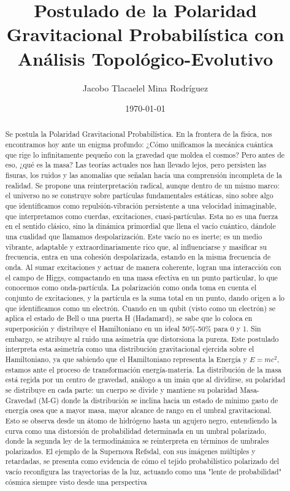 \documentclass[11pt, a4paper]{article}
\title{Postulado de la Polaridad Gravitacional Probabilística con Análisis Topológico-Evolutivo}
\author{Jacobo Tlacaelel Mina Rodríguez}
\date{\today}
\begin{document}

\maketitle

\begin{abstract}
Se postula la Polaridad Gravitacional Probabilística. En la frontera de la física, nos encontramos hoy ante un enigma profundo: ¿Cómo unificamos la mecánica cuántica que rige lo infinitamente pequeño con la gravedad que moldea el cosmos? Pero antes de eso, ¿qué es la masa? Las teorías actuales nos han llevado lejos, pero persisten las fisuras, los ruidos y las anomalías que señalan hacia una comprensión incompleta de la realidad. Se propone una reinterpretación radical, aunque dentro de un mismo marco: el universo no se construye sobre partículas fundamentales estáticas, sino sobre algo que identificamos como repulsión-vibración persistente a una velocidad inimaginable, que interpretamos como cuerdas, excitaciones, cuasi-partículas. Esta no es una fuerza en el sentido clásico, sino la dinámica primordial que llena el vacío cuántico, dándole una cualidad que llamamos despolarización. Este vacío no es inerte; es un medio vibrante, adaptable y extraordinariamente rico que, al influenciarse y masificar su frecuencia, entra en una cohesión despolarizada, estando en la misma frecuencia de onda. Al sumar excitaciones y actuar de manera coherente, logran una interacción con el campo de Higgs, compactando en una masa efectiva en un punto particular, lo que conocemos como onda-partícula. La polarización como onda toma en cuenta el conjunto de excitaciones, y la partícula es la suma total en un punto, dando origen a lo que identificamos como un electrón. Cuando en un qubit (visto como un electrón) se aplica el estado de Bell o una puerta H (Hadamard), se sabe que lo coloca en superposición y distribuye el Hamiltoniano en un ideal 50\%-50\% para 0 y 1. Sin embargo, se atribuye al ruido una asimetría que distorsiona la pureza. Este postulado interpreta esta asimetría como una distribución gravitacional ejercida sobre el Hamiltoniano, ya que sabiendo que el Hamiltoniano representa la Energía y \(E=mc^2\), estamos ante el proceso de transformación energía-materia. La distribución de la masa está regida por un centro de gravedad, análogo a un imán que al dividirse, su polaridad se distribuye en cada parte: un cuerpo se divide y mantiene su polaridad Masa-Gravedad (M-G) donde la distribución se inclina hacia un estado de mínimo gasto de energía osea que a mayor masa, mayor alcance de rango en el umbral gravitacional. Esto se observa desde un átomo de hidrógeno hasta un agujero negro, entendiendo la curva como una distorsión de probabilidad determinada en un umbral polarizado, donde la segunda ley de la termodinámica se reinterpreta en términos de umbrales polarizados. El ejemplo de la Supernova Refsdal, con sus imágenes múltiples y retardadas, se presenta como evidencia de cómo el tejido probabilístico polarizado del vacío reconfigura las trayectorias de la luz, actuando como una "lente de probabilidad" cósmica siempre visto desde una perspectiva 
\end{abstract}
\end{document}
